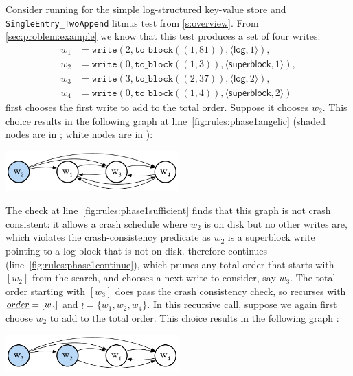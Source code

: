 \begin{example}\label{sec:alg:example}
Consider running  for the simple log-structured key-value store
and \texttt{SingleEntry_TwoAppend} litmus test from \cref{s:overview}.
From \cref{sec:problem:example} we know that this test produces a set \wr of four writes:
%
\begin{align*}
    w_1 &= \texttt{write}(2, \texttt{to_block}((1, 81)), \langle \textsf{log}, 1 \rangle), \\
    w_2 &= \texttt{write}(0, \texttt{to_block}((1, 3)),  \langle \textsf{superblock}, 1 \rangle), \\
    w_3 &= \texttt{write}(3, \texttt{to_block}((2, 37)), \langle \textsf{log}, 2 \rangle), \\
    w_4 &= \texttt{write}(0, \texttt{to_block}((1, 4)),  \langle \textsf{superblock}, 2 \rangle)
\end{align*}
%
\phaseone first chooses the first write to add to the total order.
Suppose it chooses $w_2$.
This choice results in the following graph \gr at line~\ref{fig:rules:phase1angelic}
(shaded nodes are in \ord; white nodes are in \wr):
%
\begin{center}\includegraphics[width=0.5\textwidth]{figs/sec4-1.pdf}\end{center}
%
The check at line~\ref{fig:rules:phase1sufficient}
finds that this graph is not crash consistent: it allows a crash schedule where $w_2$ is on disk but no other writes are,
which violates the crash-consistency predicate as $w_2$ is a superblock write pointing to a log block that is not on disk.
\phaseone therefore continues (line~\ref{fig:rules:phase1continue}),
which prunes any total order that starts with $[w_2]$ from the search,
and chooses a next write to consider, say $w_3$.
The total order starting with $[w_3]$ does pass the crash consistency check,
so \phaseone recurses with $\emph{order} = [w_3]$ and $\wr = \{w_1, w_2, w_4\}$.
In this recursive call,
suppose we again first choose $w_2$ to add to the total order.
This choice results in the following graph \gr:
%
\begin{center}\includegraphics[width=0.5\textwidth]{figs/sec4-2.pdf}\end{center}

\end{example}
